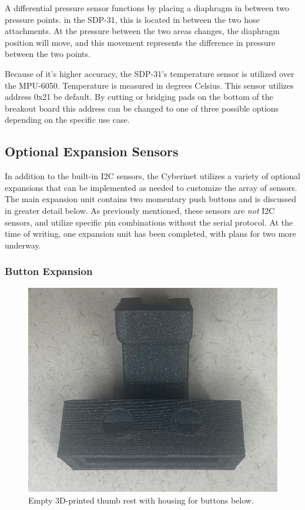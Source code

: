 A differential pressure sensor functions by placing a diaphragm in between two pressure points. in the SDP-31, this is located in between the two hose attachments. At the pressure between the two areas changes, the diaphragm position will move, and this movement represents the difference in pressure between the two points\cite{airflow}.

Because of it’s higher accuracy, the SDP-31’s temperature sensor is utilized over the MPU-6050. Temperature is measured in degrees Celsius. This sensor utilizes address 0x21 be default. By cutting or bridging pads on the bottom of the breakout board this address can be changed to one of three possible options depending on the specific use case.

\subsection{Optional Expansion Sensors}
In addition to the built-in I2C sensors, the Cyberinet utilizes a variety of optional expansions that can be implemented as needed to customize the array of sensors. The main expansion unit contains two momentary push buttons and is discussed in greater detail below. As previously mentioned, these sensors are \emph{not} I2C sensors, and utilize specific pin combinations without the serial protocol. At the time of writing, one expansion unit has been completed, with plans for two more underway.

\subsubsection{Button Expansion}

\begin{center}
    \begin{figure}
        \centering
        \includegraphics[scale=0.1]{diagrams/builtUnits/buttonhousingEmpty.JPG}
        \caption{Empty 3D-printed thumb rest with housing for buttons below.}
        \label{fig:buttonThumbrest}
    \end{figure}
\end{center}


